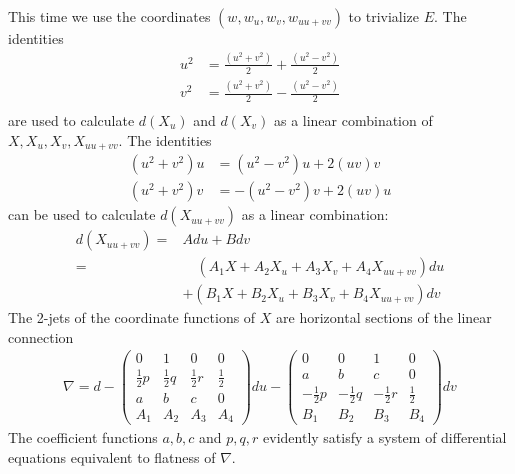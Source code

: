 \documentclass[12pt]{article}
\numberwithin{equation}{section}
\theoremstyle{plain}
\theoremstyle{definition}
\newcommand{\RP}{\mathbb{RP}}
\newcommand{\ra}{\rightarrow}
\begin{document}
This time we use the coordinates $(w,w_{u},w_{v},w_{uu+vv})$ to trivialize $E$. The identities 
\begin{align*}
u^{2}&=\frac{(u^{2}+v^{2})}{2}+\frac{(u^{2}-v^{2})}{2}\\
v^{2}&=\frac{(u^{2}+v^{2})}{2}-\frac{(u^{2}-v^{2})}{2}\\
\end{align*}
are used to calculate $d(X_{u})$ and $d(X_{v})$ as a linear combination of $X,X_{u},X_{v},X_{uu+vv}$. The identities
\begin{align*}
(u^{2}+v^{2})u&=(u^{2}-v^{2})u+2(uv)v\\
(u^{2}+v^{2})v&=-(u^{2}-v^{2})v+2(uv)u
\end{align*}
can be used to calculate $d(X_{uu+vv})$ as a linear combination:
\begin{align*}
d(X_{uu+vv})=&Adu+Bdv\\
=&\quad(A_{1}X+A_{2}X_{u}+A_{3}X_{v}+A_{4}X_{uu+vv})du\\
&+(B_{1}X+B_{2}X_{u}+B_{3}X_{v}+B_{4}X_{uu+vv})dv
\end{align*}
The 2-jets of the coordinate functions of $X$ are horizontal sections of the linear connection
\begin{align*}
\nabla= d -
\begin{pmatrix}
0 & 1 & 0 & 0\\
\tfrac{1}{2}p &\tfrac{1}{2}q &\tfrac{1}{2}r & \tfrac{1}{2}\\
a & b & c & 0 \\
A_{1}&A_{2}&A_{3}&A_{4}
\end{pmatrix}du
-\begin{pmatrix}
0 & 0 & 1 & 0\\
a & b & c & 0\\
-\tfrac{1}{2}p &-\tfrac{1}{2}q &-\tfrac{1}{2}r &\tfrac{1}{2}\\
B_{1}&B_{2}&B_{3}&B_{4}
\end{pmatrix}dv
\end{align*}
The coefficient functions $a,b,c$ and $p,q,r$ evidently satisfy a system of differential equations equivalent to flatness of $\nabla$.
\end{document}

